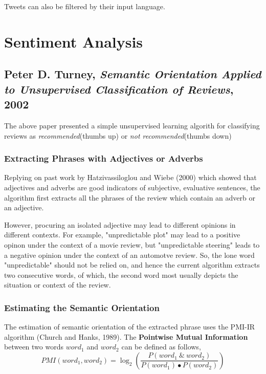 \documentclass{llncs}
\begin{document}


Tweets can also be filtered by their input language.




\section{Sentiment Analysis}

\subsection{Peter D. Turney, \emph{Semantic Orientation Applied to Unsupervised Classification of Reviews}, 2002}

The above paper presented a simple unsupervised learning algorith  for classifying reviews as \emph{recommended}(thumbs up) or \emph{not recommended}(thumbs down)

\subsubsection{Extracting Phrases with Adjectives or Adverbs}
Replying on past work by Hatzivassiloglou and Wiebe (2000) which showed that adjectives and adverbs are good indicators of subjective, evaluative sentences, the algorithm first extracts all the phrases of the review which contain an adverb or an adjective.

However, procuring an isolated adjective may lead to different opinions in different contexts. For example, "unpredictable plot" may lead to a positive opinon under the context of a movie review, but "unpredictable steering" leads to a negative opinion under the context of an automotve review. So, the lone word "unpredictable" should not be relied on, and hence the current algorithm extracts two consecutive words, of which, the second word most usually depicts the situation or context of the review.

\subsubsection{Estimating the Semantic Orientation}
The estimation of semantic orientation of the extracted phrase uses the PMI-IR algorithm (Church and Hanks, 1989). The \textbf{Pointwise Mutual Information} between two words $word_1$ and $word_2$ can be defined as follows,
$$
PMI(word_1, word_2) = \log _2 \left( \dfrac{P(word_1 \ \& \ word_2)}{P(word_1) \bullet P(word_2)} \right)
$$
\end{document}
